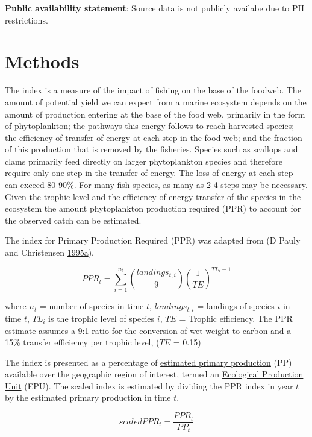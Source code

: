 \documentclass[
]{book}
\begin{document}
\textbf{Public availability statement}: Source data is not publicly availabe due to PII restrictions.

\hypertarget{methods-28}{%
\section{Methods}\label{methods-28}}

The index is a measure of the impact of fishing on the base of the foodweb. The amount of potential yield we can expect from a marine ecosystem depends on the amount of production entering at the base of the food web, primarily in the form of phytoplankton; the pathways this energy follows to reach harvested species; the efficiency of transfer of energy at each step in the food web; and the fraction of this production that is removed by the fisheries. Species such as scallops and clams primarily feed directly on larger phytoplankton species and therefore require only one step in the transfer of energy. The loss of energy at each step can exceed 80-90\%. For many fish species, as many as 2-4 steps may be necessary. Given the trophic level and the efficiency of energy transfer of the species in the ecosystem the amount phytoplankton production required (PPR) to account for the observed catch can be estimated.

The index for Primary Production Required (PPR) was adapted from (D Pauly and Christensen \protect\hyperlink{ref-pauly1995ppr}{1995}\protect\hyperlink{ref-pauly1995ppr}{a}).

\[PPR_t = \sum_{i=1}^{n_t}  \left(\frac{landings_{t,i}}{9}\right) \left(\frac{1}{TE}\right)^{TL_i-1}\]

where \(n_t\) = number of species in time \(t\), \(landings_{t,i}\) = landings of species \(i\) in time \(t\), \(TL_i\) is the trophic level of species \(i\), \(TE\) = Trophic efficiency. The PPR estimate assumes a 9:1 ratio for the conversion of wet weight to carbon and a 15\% transfer efficiency per trophic level, (\(TE\) = 0.15)

The index is presented as a percentage of \href{https://noaa-edab.github.io/tech-doc/chl-pp.html}{estimated primary production} (PP) available over the geographic region of interest, termed an \href{https://noaa-edab.github.io/tech-doc/comdat.html}{Ecological Production Unit} (EPU). The scaled index is estimated by dividing the PPR index in year \(t\) by the estimated primary production in time \(t\).

\[scaledPPR_t = \frac{PPR_t}{PP_t}\]
\end{document}
